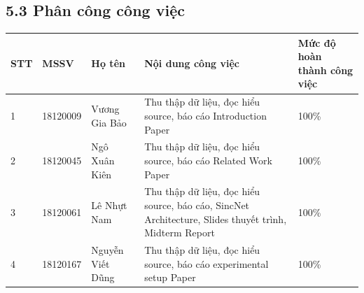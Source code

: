 \documentclass{article}
\newcommand\T{\rule{0pt}{2.6ex}}       %
\newcommand\B{\rule[-1.2ex]{0pt}{0pt}} %
\begin{document}
	\subsection{5.3 Phân công công việc}
	\begin{center}
		\begin{tabular}{ | l | l | l | p{5cm} | p{3cm} |}
			\hline
			STT & MSSV & Họ tên & Nội dung công việc & Mức độ hoàn thành công việc  \T\B\\ \hline
			1 & 18120009 & Vương Gia Bảo & Thu thập dữ liệu, đọc hiểu source, báo cáo Introduction Paper &  100\%\T\B\\ \hline
			2 & 18120045 & Ngô Xuân Kiên & Thu thập dữ liệu, đọc hiểu source, báo cáo Related Work Paper & 100\%\T\B \\ \hline
			3 & 18120061 & Lê Nhựt Nam & Thu thập dữ liệu, đọc hiểu source, báo cáo, SincNet Architecture, Slides thuyết trình, Midterm Report & 100\%\T\B \\ \hline
			4 & 18120167 & Nguyễn Viết Dũng &  Thu thập dữ liệu, đọc hiểu source, báo cáo experimental setup Paper & 100\%\T\B \\ \hline
		\end{tabular}
	\end{center}
	\nocite{*}
	\newpage\cleardoublepage
	
	
\end{document}
